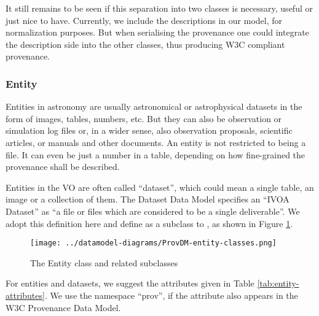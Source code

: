 
It still remains to be seen if this separation into two classes is necessary, 
useful or just nice to have. Currently, we include the descriptions in our model, 
for normalization purposes. But when serialising the provenance one could 
integrate the description side into the other classes, thus producing W3C 
compliant provenance.


\subsubsection{Entity}
Entities in astronomy are usually astronomical or astrophysical datasets in the 
form of images, tables, numbers, etc. But they can also be observation or 
simulation log files or, in a wider sense, also observation proposals, scientific 
articles, or manuals and other documents. An entity is not restricted to being
a file. 
It can even be just a number in a table, depending on how fine-grained the 
provenance shall be described.

Entities in the VO are often called ``dataset'', which could mean a single 
table, an image or a collection of them. The Dataset Data Model 
\citep{std:DatasetDM} specifies an ``IVOA Dataset'' as ``a file or files which 
are considered to be a single deliverable''. We adopt this definition here and 
define  as a subclass to , as shown in 
Figure \ref{fig:entityclasses}.

\begin{figure}[h]
\centering
\texttt{[image: ../datamodel-diagrams/ProvDM-entity-classes.png]}
\caption{The Entity class and related subclasses}
\label{fig:entityclasses}
\end{figure}

For entities and datasets, we suggest the attributes given in Table 
\ref{tab:entity-attributes}. 
We use the namespace ``prov'', if the attribute also appears in the W3C 
Provenance Data Model.

